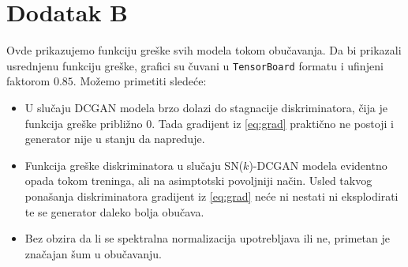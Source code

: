 \documentclass[12pt, a4paper]{article}
\begin{document}
\section*{Dodatak B}
Ovde prikazujemo funkciju greške svih modela tokom obučavanja. Da bi prikazali usrednjenu funkciju greške, grafici su čuvani u \texttt{TensorBoard} formatu i ufinjeni faktorom $0.85$. Možemo primetiti sledeće:
\begin{itemize}
	\item U slučaju DCGAN modela brzo dolazi do stagnacije diskriminatora, čija je funkcija greške približno $0$. Tada gradijent iz \ref{eq:grad} praktično ne postoji i generator nije u stanju da napreduje.
	\item Funkcija greške diskriminatora u slučaju SN($k$)-DCGAN modela evidentno opada tokom treninga, ali na asimptotski povoljniji način. Usled takvog ponašanja diskriminatora gradijent iz \ref{eq:grad} neće ni nestati ni eksplodirati te se generator daleko bolja obučava.
	\item Bez obzira da li se spektralna normalizacija upotrebljava ili ne, primetan je značajan šum u obučavanju.
\end{itemize}
\end{document}
